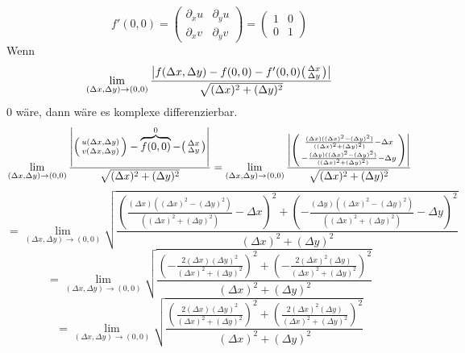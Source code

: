\documentclass{scrartcl}
\let\-\rightarrow
\begin{document}
\[f'(0,0)=\begin{pmatrix}\partial_x u&\partial_y u\\\partial_x v&\partial_y v\end{pmatrix}=\begin{pmatrix}1&0\\0&1\end{pmatrix}\]
Wenn
\[\lim_{(\Delta x,\Delta y)\rightarrow(0,0)}\frac{\left|f(\Delta x,\Delta y)-f(0,0)-f'(0,0)\begin{psmallmatrix}\Delta x\\\Delta y\end{psmallmatrix}\right|}{\sqrt{(\Delta x)^2+(\Delta y)^2}}\]
0 wäre, dann wäre es komplexe differenzierbar.
\[\lim_{(\Delta x,\Delta y)\rightarrow(0,0)}\frac{\left|\begin{psmallmatrix}u(\Delta x,\Delta y)\\v(\Delta x,\Delta y)\end{psmallmatrix}-\overbrace{f(0,0)}^0-\begin{psmallmatrix}\Delta x\\\Delta y\end{psmallmatrix}\right|}{\sqrt{(\Delta x)^2+(\Delta y)^2}}=\lim_{(\Delta x,\Delta y)\rightarrow(0,0)}\frac{\left|\begin{psmallmatrix}\frac{(\Delta x)((\Delta x)^2 - (\Delta y)^2)}{((\Delta x)^2+(\Delta y)^2)}-\Delta x\\-\frac{(\Delta y)((\Delta x)^2 - (\Delta y)^2)}{((\Delta x)^2+(\Delta y)^2)}-\Delta y\end{psmallmatrix}\right|}{\sqrt{(\Delta x)^2+(\Delta y)^2}}\]
\[=\lim_{(\Delta x,\Delta y)\rightarrow(0,0)}\sqrt{\frac{\left(\frac{(\Delta x)((\Delta x)^2 - (\Delta y)^2)}{((\Delta x)^2+(\Delta y)^2)}-\Delta x\right)^2+\left(-\frac{(\Delta y)((\Delta x)^2 - (\Delta y)^2)}{((\Delta x)^2+(\Delta y)^2)}-\Delta y\right)^2}{(\Delta x)^2+(\Delta y)^2}}\]
\[=\lim_{(\Delta x,\Delta y)\rightarrow(0,0)}\sqrt{\frac{\left(-\frac{2 (\Delta x) (\Delta y)^2}{(\Delta x)^2+(\Delta y)^2}\right)^2+\left(-\frac{2 (\Delta x)^2 (\Delta y)}{(\Delta x)^2+(\Delta y)^2}\right)^2}{(\Delta x)^2+(\Delta y)^2}}\]
\[=\lim_{(\Delta x,\Delta y)\rightarrow(0,0)}\sqrt{\frac{\left(\frac{2 (\Delta x) (\Delta y)^2}{(\Delta x)^2+(\Delta y)^2}\right)^2+\left(\frac{2 (\Delta x)^2 (\Delta y)}{(\Delta x)^2+(\Delta y)^2}\right)^2}{(\Delta x)^2+(\Delta y)^2}}\]
\end{document}
